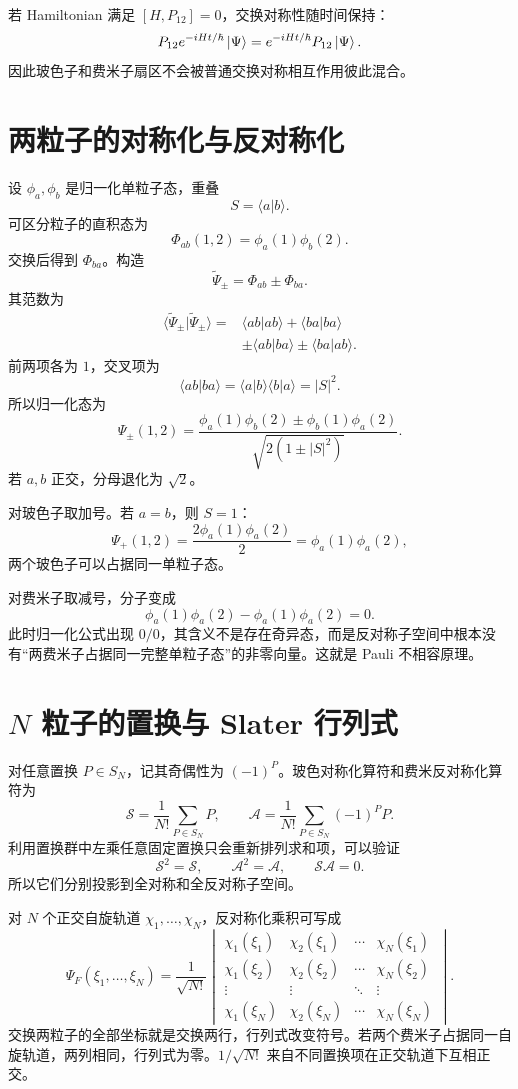 若 Hamiltonian 满足 $[H,P_{12}]=0$，交换对称性随时间保持：
\[
P_{12}e^{-iHt/\hbar}\left|\Psi\right\rangle
=e^{-iHt/\hbar}P_{12}\left|\Psi\right\rangle.
\]
因此玻色子和费米子扇区不会被普通交换对称相互作用彼此混合。

\section{两粒子的对称化与反对称化}
设 $\phi_a,\phi_b$ 是归一化单粒子态，重叠
\[
S=\langle a|b\rangle.
\]
可区分粒子的直积态为
\[
\Phi_{ab}(1,2)=\phi_a(1)\phi_b(2).
\]
交换后得到 $\Phi_{ba}$。构造
\[
\widetilde\Psi_\pm=\Phi_{ab}\pm\Phi_{ba}.
\]
其范数为
\[
\begin{aligned}
\langle\widetilde\Psi_\pm|\widetilde\Psi_\pm\rangle
={}&\langle ab|ab\rangle+\langle ba|ba\rangle\\
&\pm\langle ab|ba\rangle
\pm\langle ba|ab\rangle.
\end{aligned}
\]
前两项各为 $1$，交叉项为
\[
\langle ab|ba\rangle
=\langle a|b\rangle\langle b|a\rangle=|S|^2.
\]
所以归一化态为
\[
\boxed{
\Psi_\pm(1,2)=
\frac{\phi_a(1)\phi_b(2)\pm\phi_b(1)\phi_a(2)}
{\sqrt{2(1\pm|S|^2)}}}.
\]
若 $a,b$ 正交，分母退化为 $\sqrt2$。

\begin{examplebox}[title=例 1：相同轨道极限与 Pauli 原理]
对玻色子取加号。若 $a=b$，则 $S=1$：
\[
\Psi_+(1,2)
=\frac{2\phi_a(1)\phi_a(2)}2
=\phi_a(1)\phi_a(2),
\]
两个玻色子可以占据同一单粒子态。

对费米子取减号，分子变成
\[
\phi_a(1)\phi_a(2)-\phi_a(1)\phi_a(2)=0.
\]
此时归一化公式出现 $0/0$，其含义不是存在奇异态，而是反对称子空间中根本没有“两费米子占据同一完整单粒子态”的非零向量。这就是 Pauli 不相容原理。
\end{examplebox}

\section{$N$ 粒子的置换与 Slater 行列式}
对任意置换 $P\in S_N$，记其奇偶性为 $(-1)^P$。玻色对称化算符和费米反对称化算符为
\[
\mathcal S=\frac1{N!}\sum_{P\in S_N}P,
\qquad
\mathcal A=\frac1{N!}\sum_{P\in S_N}(-1)^P P.
\]
利用置换群中左乘任意固定置换只会重新排列求和项，可以验证
\[
\mathcal S^2=\mathcal S,\qquad
\mathcal A^2=\mathcal A,\qquad
\mathcal S\mathcal A=0.
\]
所以它们分别投影到全对称和全反对称子空间。

对 $N$ 个正交自旋轨道 $\chi_1,\ldots,\chi_N$，反对称化乘积可写成
\[
\boxed{
\Psi_F(\xi_1,\ldots,\xi_N)
=\frac1{\sqrt{N!}}
\begin{vmatrix}
\chi_1(\xi_1)&\chi_2(\xi_1)&\cdots&\chi_N(\xi_1)\\
\chi_1(\xi_2)&\chi_2(\xi_2)&\cdots&\chi_N(\xi_2)\\
\vdots&\vdots&\ddots&\vdots\\
\chi_1(\xi_N)&\chi_2(\xi_N)&\cdots&\chi_N(\xi_N)
\end{vmatrix}}.
\]
交换两粒子的全部坐标就是交换两行，行列式改变符号。若两个费米子占据同一自旋轨道，两列相同，行列式为零。$1/\sqrt{N!}$ 来自不同置换项在正交轨道下互相正交。

